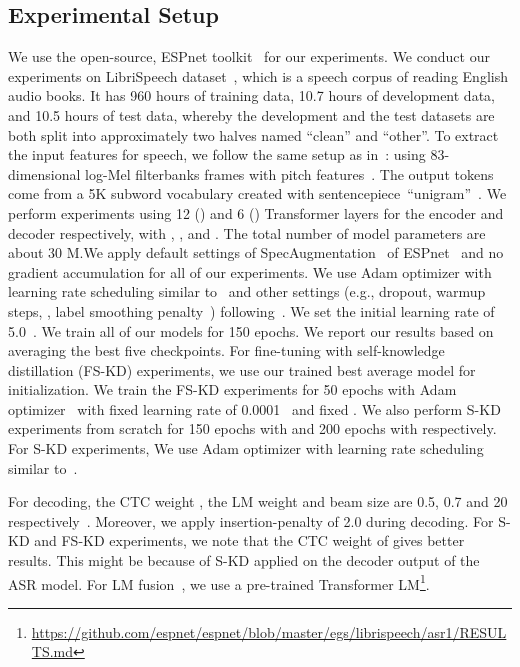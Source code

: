 \documentclass{article}
\begin{document}
\subsection{Experimental Setup}
We use the open-source, ESPnet toolkit~\citep{espnet} for our experiments. We conduct our experiments on LibriSpeech dataset~\citep{panayotov2015librispeech}, which is a speech corpus of reading English audio books. It has 960 hours of training data, 10.7 hours of development data, and 10.5 hours of test data, whereby the development and the test datasets are both split into approximately two halves named “clean” and “other”. To extract the input features for speech, we follow the same setup as in~\citep{espnet, karita2019asru}: using 83-dimensional log-Mel filterbanks frames with pitch features~\citep{karita2019asru,moritz2020}. The output tokens come from a 5K subword vocabulary created with sentencepiece~\citep{kudo2018sentencepiece}``unigram''~\citep{espnet}. We perform experiments using 12 () and 6 () Transformer layers for the encoder and decoder respectively, with , , and . The total number of model parameters are about 30 M.We apply default settings of SpecAugmentation~\citep{specaugment} of ESPnet~\citep{espnet} and no gradient accumulation for all of our experiments. We use Adam optimizer with learning rate scheduling similar to~\citep{vaswani2017attention,espnet} and other  settings (e.g., dropout, warmup steps, , label smoothing penalty~\citep{specaugment}) following~\citep{moritz2020,espnet}. We set the initial learning rate of 5.0~\citep{espnet}. We train all of our models for 150 epochs. We report our results based on averaging the best five checkpoints. 
For fine-tuning with self-knowledge distillation (FS-KD) experiments, we use our trained best average model for initialization. We train the FS-KD experiments for 50 epochs with Adam optimizer~\citep{adam} with fixed learning rate of 0.0001~\citep{espnet} and fixed . We also perform S-KD experiments from scratch for 150 epochs with  and 200 epochs with  respectively. For S-KD experiments, We use Adam optimizer with learning rate scheduling similar to~\citep{vaswani2017attention,espnet}.

For decoding, the CTC weight , the LM weight  and beam size are 0.5, 0.7 and 20 respectively~\citep{moritz2020,espnet}. Moreover, we apply insertion-penalty of 2.0 during decoding. For S-KD and FS-KD experiments, we note that the CTC weight of  gives better results. This might be because of S-KD applied on the decoder output of the ASR model. For LM fusion~\citep{shallow2018}, we use a pre-trained Transformer LM\footnote{ \url{https://github.com/espnet/espnet/blob/master/egs/librispeech/asr1/RESULTS.md}}.
\end{document}
